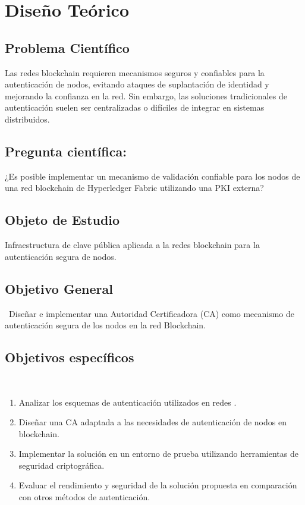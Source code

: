 \section{Diseño Teórico}
\subsection*{Problema Científico}

Las redes blockchain requieren mecanismos seguros y confiables para la autenticación de nodos, evitando ataques de suplantación de identidad y mejorando la confianza en la red. Sin embargo, las soluciones tradicionales de autenticación suelen ser centralizadas o difíciles de integrar en sistemas distribuidos. 

\subsection*{Pregunta científica:} ¿Es posible implementar un mecanismo de validación confiable para los nodos de una red blockchain de Hyperledger Fabric utilizando una PKI externa?

\subsection*{Objeto de Estudio}
Infraestructura de clave pública aplicada a la redes blockchain para la autenticación segura de nodos.

\subsection*{Objetivo General}\
Diseñar e implementar una Autoridad Certificadora (CA) como mecanismo de autenticación segura de los nodos en la red Blockchain.

\subsection*{Objetivos específicos}\
\begin{enumerate}
    \item Analizar los esquemas de autenticación utilizados en redes .
    \item Diseñar una CA adaptada a las necesidades de autenticación de nodos en blockchain.
    \item Implementar la solución en un entorno de prueba utilizando herramientas de seguridad criptográfica.
    \item Evaluar el rendimiento y seguridad de la solución propuesta en comparación con otros métodos de autenticación.
\end{enumerate}

